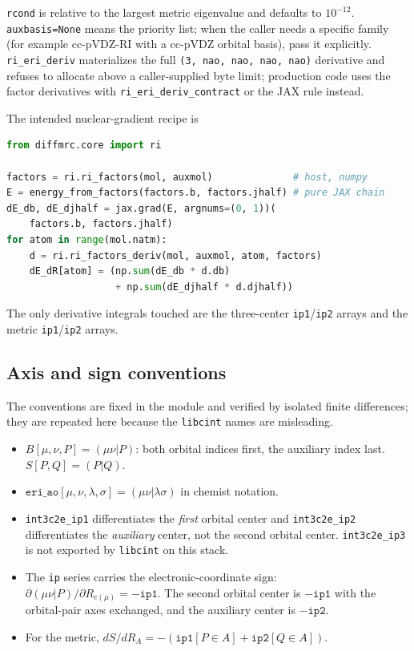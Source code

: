 \texttt{rcond} is relative to the largest metric eigenvalue and
defaults to $10^{-12}$.  \texttt{auxbasis=None} means the priority
list; when the caller needs a specific family (for example cc-pVDZ-RI
with a cc-pVDZ orbital basis), pass it explicitly.
\texttt{ri\_eri\_deriv} materializes the full
\texttt{(3, nao, nao, nao, nao)} derivative and refuses to allocate
above a caller-supplied byte limit; production code uses the factor
derivatives with \texttt{ri\_eri\_deriv\_contract} or the JAX rule
instead.

The intended nuclear-gradient recipe is

\begin{lstlisting}[language=Python]
from diffmrc.core import ri

factors = ri.ri_factors(mol, auxmol)              # host, numpy
E = energy_from_factors(factors.b, factors.jhalf) # pure JAX chain
dE_db, dE_djhalf = jax.grad(E, argnums=(0, 1))(
    factors.b, factors.jhalf)
for atom in range(mol.natm):
    d = ri.ri_factors_deriv(mol, auxmol, atom, factors)
    dE_dR[atom] = (np.sum(dE_db * d.db)
                   + np.sum(dE_djhalf * d.djhalf))
\end{lstlisting}

The only derivative integrals touched are the three-center
\texttt{ip1}/\texttt{ip2} arrays and the metric \texttt{ip1}/\texttt{ip2}
arrays.

\subsection{Axis and sign conventions}
\label{sec:ri-conventions}

The conventions are fixed in the module and verified by isolated finite
differences; they are repeated here because the \texttt{libcint} names
are misleading.

\begin{itemize}
\item $B[\mu,\nu,P] = (\mu\nu|P)$: both orbital indices first, the
  auxiliary index last.  $S[P,Q] = (P|Q)$.
\item $\texttt{eri\_ao}[\mu,\nu,\lambda,\sigma] =
  (\mu\nu|\lambda\sigma)$ in chemist notation.
\item \texttt{int3c2e\_ip1} differentiates the \emph{first} orbital
  center and \texttt{int3c2e\_ip2} differentiates the \emph{auxiliary}
  center, not the second orbital center.  \texttt{int3c2e\_ip3} is not
  exported by \texttt{libcint} on this stack.
\item The \texttt{ip} series carries the electronic-coordinate sign:
  $\partial(\mu\nu|P)/\partial R_{c(\mu)} = -\texttt{ip1}$.  The second
  orbital center is $-\texttt{ip1}$ with the orbital-pair axes
  exchanged, and the auxiliary center is $-\texttt{ip2}$.
\item For the metric,
  $dS/dR_A = -(\texttt{ip1}[P\in A] + \texttt{ip2}[Q\in A])$.
\end{itemize}

